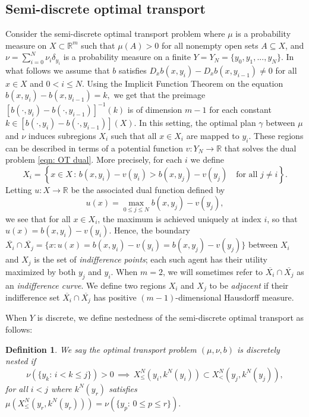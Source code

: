 \documentclass[12pt,reqno]{amsart}
\newtheorem{definition}{Definition}
\begin{document}
\subsection{Semi-discrete optimal transport}
Consider the semi-discrete optimal transport problem where $\mu$ is a probability measure on $X\subset \mathbb{R}^m$ such that $\mu(A)>0$ for all nonempty open sets $A\subseteq X$, and $\nu=\sum_{i=0}^N \nu_i \delta_{y_i}$ is a probability measure on a finite $Y=Y_N=\{y_0,y_1,...,y_N\}$. In what follows we assume that $b$ satisfies $D_xb(x,y_i) -D_xb(x,y_{i-1}) \neq 0$ for all $x\in X$ and $0<i\le N.$ Using the Implicit Function Theorem on the equation $b(x,y_i)-b(x,y_{i-1})=k,$ we get that the preimage $[b(\cdot,y_i)-b(\cdot,y_{i-1})]^{-1}(k)$ is of dimension $m-1$ for each constant $k \in [b(\cdot,y_i)-b(\cdot,y_{i-1})](X).$   In this setting, the optimal plan $\gamma$ between $\mu$ and $\nu$ induces subregions $X_i$ such that all $x \in X_i$ are mapped to $y_i$. These regions can be described in terms of a potential function $v : Y_N \to \mathbb{R}$ that solves the dual problem \eqref{eqn: OT dual}. More precisely, for each $i$ we define
\[
X_i = \left\{ x \in X \,:\, b(x, y_i) - v(y_i) > b(x, y_j) - v(y_j) \quad \text{for all } j \neq i \right\}.
\]
Letting $u : X \to \mathbb{R}$ be the associated dual function defined by
\[
u(x) = \max_{0\le j\le N}  b(x, y_j) - v(y_j) ,
\]
we see that for all $x \in X_i$, the maximum is achieved uniquely at index $i$, so that $u(x) = b(x, y_i) - v(y_i)$. Hence, the boundary $\overline{X_i}\cap \overline{X_j} = \{x: u(x)=b(x,y_i)-v(y_i)=b(x,y_j)-v(y_j)\}$ between $X_i$ and $X_j$ is the set of \emph{indifference points}; each such agent has their utility maximized by both $y_j$ and $y_i$. When $m=2$, we will sometimes refer to $\overline{X_i}\cap \overline{X_j}$ as an \emph{indifference curve}.   We define two regions $X_i$ and $X_j$ to be \emph{adjacent} if their indifference set $\overline{X_i} \cap \overline{X_j}$ has positive $(m-1)$-dimensional Hausdorff measure.
  
When $Y$ is discrete, we define nestedness of the semi-discrete optimal transport as follows:
\begin{definition}
    We say the optimal transport problem $(\mu,\nu,b)$ is discretely nested if 
    \[ \nu(\{y_{k}:\, i< k\le j\})>0\,\implies\,X_{\le}^N(y_{i},k^N(y_{i}))\subset X_{<}^N(y_{j},k^N(y_{j})),\] 
     for all $i<j$  where $k^N(y_{r})$  satisfies $\mu(X_{\le}^N(y_{r},k^N(y_{r})))=\nu(\{y_{p}:\, 0\le p\le r \}).$
\end{definition}
\end{document}
